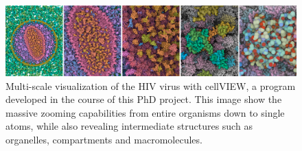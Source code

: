 \begin{figure}
\centering
\includegraphics[width=0.99\linewidth]{graphics/teaser_new}
\caption{Multi-scale visualization of the HIV virus with cellVIEW, a program developed in the course of this PhD project. This image show the massive zooming capabilities from entire organisms down to single atoms, while also revealing intermediate
	 structures such as organelles, compartments and macromolecules.}
\label{fig:teasernew}
\end{figure}



